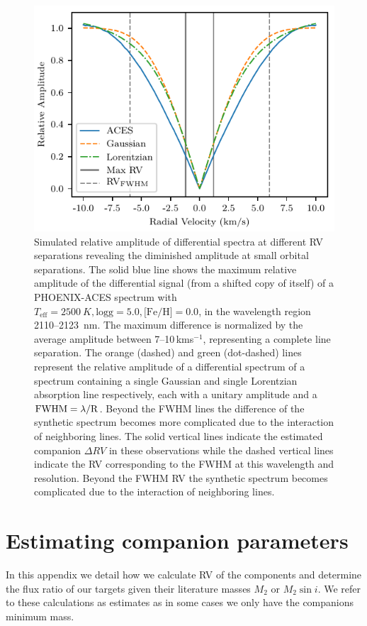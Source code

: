 \documentclass[fleqn,usenatbib]{mnras}
\newcommand{\kmps}{\,kms\(^{-1}\)}	%
\begin{document}
    \begin{figure}
        \includegraphics[width=\hsize]{images/relative_amplitude.pdf}
        \caption{Simulated relative amplitude of differential spectra at different RV separations revealing the diminished amplitude at small orbital separations. The solid blue line shows the maximum relative amplitude of the differential signal (from a shifted copy of itself) of a PHOENIX-ACES spectrum with \(T_{\textrm{eff}}=2500~K, \textrm{logg}=5.0, \textrm{[Fe/H]}=0.0\), in the wavelength region 2110--2123~nm. The maximum difference is normalized by the average amplitude between 7--10\kmps{}, representing a complete line separation. The orange (dashed) and green (dot-dashed) lines represent the relative amplitude of a differential spectrum of a spectrum containing a single Gaussian and single Lorentzian absorption line respectively, each with a unitary amplitude and a \(\rm FWHM = \lambda / R \). Beyond the FWHM lines the difference of the synthetic spectrum becomes more complicated due to the interaction of neighboring lines. The solid vertical lines indicate the estimated companion \(\Delta RV\) in these observations while the dashed vertical lines indicate the RV corresponding to the FWHM at this wavelength and resolution. Beyond the FWHM RV the synthetic spectrum becomes complicated due to the interaction of neighboring lines.}
        
        \label{fig:diff_amp}
    \end{figure}
    
    
    \section{Estimating companion parameters}
    In this appendix we detail how we calculate RV of the components and determine the flux ratio of our targets given their literature masses  \(M_2\) or \(M_{2}\sin{i}\). We refer to these calculations as estimates as in some cases we only have the companions minimum mass.
    
\end{document}
